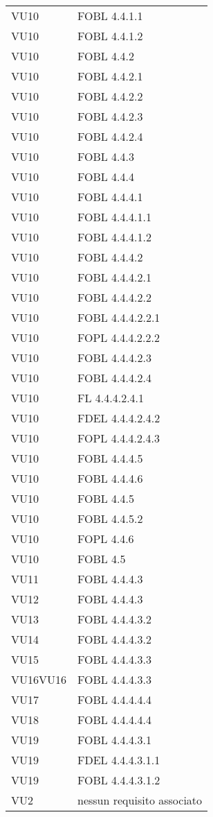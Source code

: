 \begin{longtable}{XX}
VU10&FOBL 4.4.1.1\\ 
VU10&FOBL 4.4.1.2\\ 
VU10&FOBL 4.4.2\\ 
VU10&FOBL 4.4.2.1\\ 
VU10&FOBL 4.4.2.2\\ 
VU10&FOBL 4.4.2.3\\ 
VU10&FOBL 4.4.2.4\\ 
VU10&FOBL 4.4.3\\ 
VU10&FOBL 4.4.4\\ 
VU10&FOBL 4.4.4.1\\ 
VU10&FOBL 4.4.4.1.1\\ 
VU10&FOBL 4.4.4.1.2\\ 
VU10&FOBL 4.4.4.2\\ 
VU10&FOBL 4.4.4.2.1\\ 
VU10&FOBL 4.4.4.2.2\\ 
VU10&FOBL 4.4.4.2.2.1\\ 
VU10&FOPL 4.4.4.2.2.2\\ 
VU10&FOBL 4.4.4.2.3\\ 
VU10&FOBL 4.4.4.2.4\\ 
VU10&FL 4.4.4.2.4.1\\ 
VU10&FDEL 4.4.4.2.4.2\\ 
VU10&FOPL 4.4.4.2.4.3\\ 
VU10&FOBL 4.4.4.5\\ 
VU10&FOBL 4.4.4.6\\ 
VU10&FOBL 4.4.5\\ 
VU10&FOBL 4.4.5.2\\ 
VU10&FOPL 4.4.6\\ 
VU10&FOBL 4.5\\ 
\midrule 
VU11&FOBL 4.4.4.3\\ 
\midrule 
VU12&FOBL 4.4.4.3\\ 
\midrule 
VU13&FOBL 4.4.4.3.2\\ 
\midrule 
VU14&FOBL 4.4.4.3.2\\ 
\midrule 
VU15&FOBL 4.4.4.3.3\\ 
\midrule 
VU16VU16&FOBL 4.4.4.3.3\\ 
\midrule 
VU17&FOBL 4.4.4.4.4\\ 
\midrule 
VU18&FOBL 4.4.4.4.4\\ 
\midrule 
VU19&FOBL 4.4.4.3.1\\ 
VU19&FDEL 4.4.4.3.1.1\\ 
VU19&FOBL 4.4.4.3.1.2\\ 
\midrule 
VU2&nessun requisito associato\\ 
\midrule 

\end{longtable}
